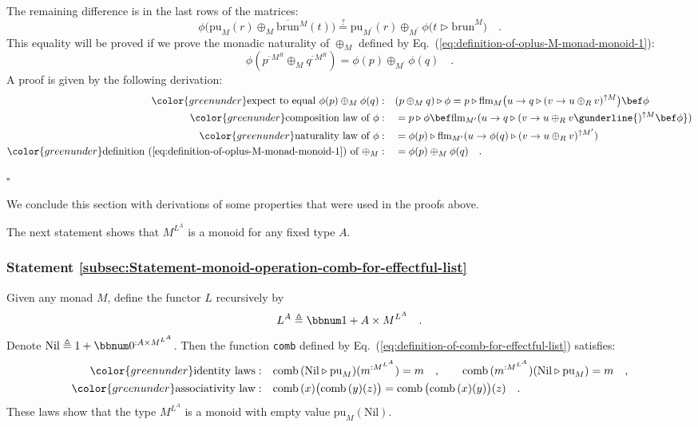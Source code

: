 The remaining difference is in the last rows of the matrices:
\[
\phi\big(\text{pu}_{M}(r)\oplus_{M}\overline{\text{brun}}{}^{M}(t)\big)\overset{?}{=}\text{pu}_{M^{\prime}}(r)\oplus_{M^{\prime}}\phi\big(t\triangleright\text{brun}^{M}\big)\quad.
\]
This equality will be proved if we prove the monadic
naturality of $\oplus_{M}$ defined by Eq.~(\ref{eq:definition-of-oplus-M-monad-monoid-1}):
\[
\phi(p^{:M^{R}}\oplus_{M}q^{:M^{R}})=\phi(p)\oplus_{M^{\prime}}\phi(q)\quad.
\]
A proof is given by the following derivation:
\begin{align*}
{\color{greenunder}\text{expect to equal }\phi(p)\oplus_{M}\phi(q):}\quad & (p\oplus_{M}q)\triangleright\phi=p\triangleright\text{flm}_{M}\big(u\rightarrow q\triangleright(v\rightarrow u\oplus_{R}v)^{\uparrow M}\big)\bef\phi\\
{\color{greenunder}\text{composition law of }\phi:}\quad & =p\triangleright\phi\bef\text{flm}_{M^{\prime}}(u\rightarrow q\triangleright(v\rightarrow u\oplus_{R}v\gunderline{)^{\uparrow M}\bef\phi})\\
{\color{greenunder}\text{naturality law of }\phi:}\quad & =\phi(p)\triangleright\text{flm}_{M^{\prime}}(u\rightarrow\phi(q)\triangleright(v\rightarrow u\oplus_{R}v)^{\uparrow M^{\prime}})\\
{\color{greenunder}\text{definition~(\ref{eq:definition-of-oplus-M-monad-monoid-1}) of }\oplus_{M}:}\quad & =\phi(p)\oplus_{M}\phi(q)\quad.
\end{align*}

$\square$

We conclude this section with derivations of some properties that
were used in the proofs above. 

The next statement shows that $M^{L^{A}}$ is a monoid for any fixed
type $A$.

\subsubsection{Statement \label{subsec:Statement-monoid-operation-comb-for-effectful-list}\ref{subsec:Statement-monoid-operation-comb-for-effectful-list}}

Given any monad $M$, define the functor $L$ recursively by 
\[
L^{A}\triangleq\bbnum 1+A\times M^{L^{A}}\quad.
\]
Denote $\text{Nil}\triangleq1+\bbnum 0^{:A\times M^{L^{A}}}$. Then
the function \lstinline!comb! defined by Eq.~(\ref{eq:definition-of-comb-for-effectful-list})
satisfies:
\begin{align*}
{\color{greenunder}\text{identity laws}:}\quad & \text{comb}\,(\text{Nil}\triangleright\text{pu}_{M})(m^{:M^{L^{A}}})=m\quad,\quad\quad\text{comb}\,(m^{:M^{L^{A}}})(\text{Nil}\triangleright\text{pu}_{M})=m\quad,\\
{\color{greenunder}\text{associativity law}:}\quad & \text{comb}\,(x)\big(\text{comb}\,(y)(z)\big)=\text{comb}\,\big(\text{comb}\,(x)(y)\big)(z)\quad.
\end{align*}
These laws show that the type $M^{L^{A}}$ is a monoid with empty
value $\text{pu}_{M}(\text{Nil})$.


